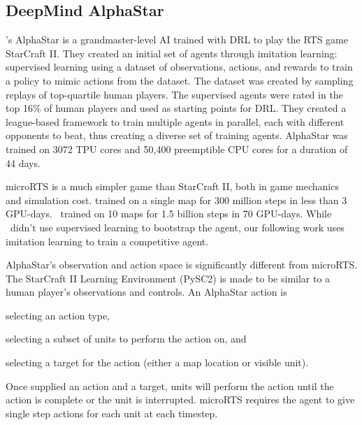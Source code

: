 \documentclass[conference]{IEEEtran}
\begin{document}
\subsection{DeepMind AlphaStar}
\cite{Vinyals2019GrandmasterLI}'s AlphaStar is a grandmaster-level AI trained with DRL to play the RTS game
StarCraft II. They created an initial set of agents through imitation learning: supervised learning
using a dataset of observations, actions, and rewards to train a policy to mimic actions
from the dataset. The dataset was created by sampling replays of top-quartile human
players. The supervised agents were rated in the top 16\% of human players and used as
starting points for DRL. They created a league-based framework to train multiple agents
in parallel, each with different opponents to beat, thus creating a diverse set of
training agents. AlphaStar was trained on 3072 TPU cores and 50,400 preemptible CPU
cores for a duration of 44 days.

microRTS is a much simpler game than StarCraft II, both in game mechanics and simulation
cost. \cite{DBLP:journals/corr/abs-2105-13807} trained on a single map for 300 million
steps in less than 3 GPU-days. \agentName\ trained on 10 maps for 1.5 billion steps in
70 GPU-days. While \agentName\ didn't use supervised learning to bootstrap the agent,
our following work uses imitation learning to train a competitive agent.

AlphaStar's observation and action space is significantly different from microRTS. The
StarCraft II Learning Environment (PySC2) is made to be similar to a human player's
observations and controls. An AlphaStar action is 
\begin{inparaenum}[(1)]
    \item selecting an action type,
    \item selecting a subset of units to perform the action on, and
    \item selecting a target for the action (either a map location or visible unit).
\end{inparaenum}
Once supplied an action and a target, units will perform the action until the action is complete or the unit is interrupted.
microRTS requires the agent to give single step actions for each unit at each timestep.
\end{document}
